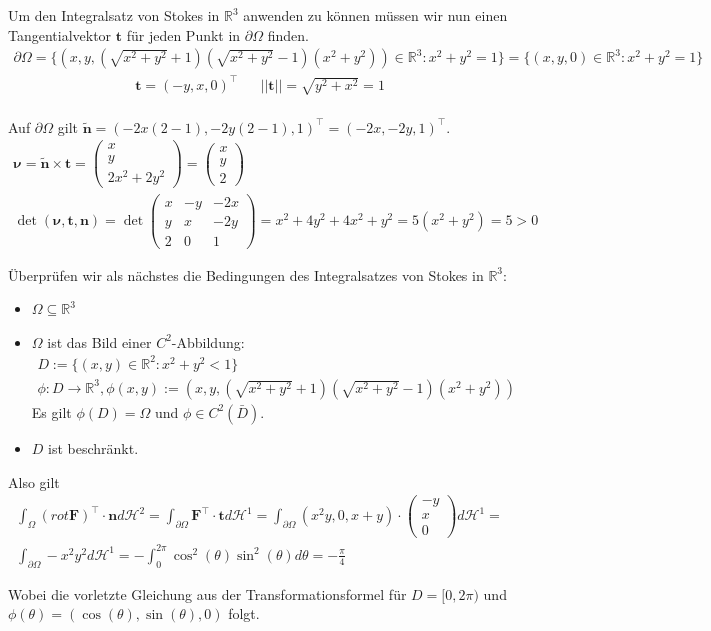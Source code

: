 \documentclass[]{article}
\begin{document}
Um den Integralsatz von Stokes in $\mathbb{R}^3$ anwenden zu können müssen wir nun einen Tangentialvektor $\bm{t}$ für jeden Punkt in $\partial\Omega$ finden.
\begin{align*}
	\partial\Omega = \{(x,y,(\sqrt{x^2+y^2}+1)(\sqrt{x^2+y^2}-1)(x^2+y^2)) \in \mathbb{R}^3: x^2+y^2=1\} = \{(x,y,0) \in \mathbb{R}^3: x^2+y^2=1\}
\end{align*}
\begin{align*}
	\bm{t} = (-y, x, 0)^\top && ||\bm{t}|| = \sqrt{y^2+x^2} = 1\\
\end{align*}

Auf $\partial\Omega$ gilt $\tilde{\bm{n}}=(-2x(2-1), -2y(2-1), 1)^\top = (-2x, -2y, 1)^\top$.
\begin{align*}
	\bm{\nu} = \tilde{\bm{n}} \times \bm{t} = \begin{pmatrix} x\\ y\\ 2x^2+2y^2 \end{pmatrix} = \begin{pmatrix} x\\ y\\ 2 \end{pmatrix}\\
	\det(\bm{\nu}, \bm{t}, \bm{n}) = \det\begin{pmatrix}
		x & -y & -2x\\
		y & x  & -2y\\
		2 & 0  & 1
	\end{pmatrix} = x^2+4y^2+4x^2+y^2 = 5(x^2+y^2) = 5 > 0
\end{align*}

Überprüfen wir als nächstes die Bedingungen des Integralsatzes von Stokes in $\mathbb{R}^3$:

\begin{itemize}
	\item $\Omega \subseteq \mathbb{R}^3$
	\item $\Omega$ ist das Bild einer $C^2$-Abbildung:
	\begin{align*}
		D := \{(x,y)\in\mathbb{R}^2: x^2+y^2 < 1\}\\
		\phi: D \rightarrow \mathbb{R}^3, \phi(x, y) := (x, y, (\sqrt{x^2+y^2}+1)(\sqrt{x^2+y^2}-1)(x^2+y^2))
	\end{align*}
	Es gilt $\phi(D)=\Omega$ und $\phi \in C^2(\bar{D})$.
	\item $D$ ist beschränkt.
\end{itemize}

Also gilt
\begin{align*}
	\int_\Omega (rot\bm{F})^\top \cdot \bm{n} d\mathcal{H}^2 = \int_{\partial\Omega} \bm{F}^\top \cdot \bm{t} d\mathcal{H}^1 = \int_{\partial\Omega} (x^2y, 0, x+y) \cdot \begin{pmatrix} -y\\ x\\ 0 \end{pmatrix} d\mathcal{H}^1 =\\
	\int_{\partial\Omega} -x^2y^2 d\mathcal{H}^1 = -\int_{0}^{2\pi} \cos^2(\theta) \sin^2(\theta) d\theta = -\frac{\pi}{4}
\end{align*}

Wobei die vorletzte Gleichung aus der Transformationsformel für $D=[0,2\pi)$ und $\phi(\theta)=(\cos(\theta), \sin(\theta), 0)$ folgt.
\end{document}

